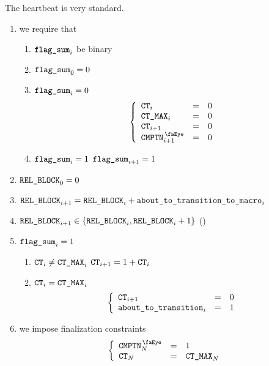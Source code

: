 The heartbeat is very standard.
\begin{enumerate}
	\item we require that
		\begin{enumerate}
		        \item $\texttt{flag\_sum} _{i}$ be binary
		        \item $\texttt{flag\_sum} _{0} = 0$
		        \item \If $\texttt{flag\_sum} _{i} = 0$ \Then
				\[
					\left\{ \begin{array}{lcl}
						\ct            _{i}      & = & 0 \\
						\maxCt         _{i}      & = & 0 \\
						\ct            _{i  + 1} & = & 0 \\
						\isComputation _{i  + 1} & = & 0 \\
					\end{array} \right.
				\]
		        \item \If $\texttt{flag\_sum} _{i} = 1$ \Then $\texttt{flag\_sum} _{i + 1} = 1$
		\end{enumerate}
	\item $\texttt{REL\_BLOCK} _{0} = 0$
	\item $\texttt{REL\_BLOCK} _{i + 1} = \texttt{REL\_BLOCK} _{i} + \texttt{about\_to\_transition\_to\_macro} _{i}$ 
	\item $\texttt{REL\_BLOCK} _{i + 1} \in \{ \texttt{REL\_BLOCK} _{i}, \texttt{REL\_BLOCK} _{i} + 1 \}$ (\sanityCheck)
	\item \If $\texttt{flag\_sum} _{i} = 1$ \Then
		\begin{enumerate}
			\item \If $\texttt{CT} _{i} \neq \texttt{CT\_MAX} _{i}$ \Then $\texttt{CT} _{i + 1} = 1 + \texttt{CT} _{i}$
			\item \If $\texttt{CT} _{i} =    \texttt{CT\_MAX} _{i}$ \Then
				\[
					\left\{ \begin{array}{lcl}
						\texttt{CT}               _{i  + 1} & = & 0 \\
						\texttt{about\_to\_transition} _{i}      & = & 1 \\
					\end{array} \right.
				\]
		\end{enumerate}
	\item we impose finalization constraints
		\[
			\left\{ \begin{array}{lcl}
				\isComputation _{N} & = & 1           \\
				\ct _{N}            & = & \maxCt _{N} \\
			\end{array} \right.
		\]
\end{enumerate}
